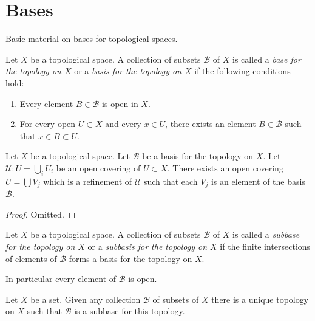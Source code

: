 \section{Bases}
\label{section-bases}

\noindent
Basic material on bases for topological spaces.

\begin{definition}
\label{definition-base}
Let $X$ be a topological space. A collection of subsets $\mathcal{B}$ of $X$
is called a {\it base for the topology on $X$} or a {\it basis for the
topology on $X$} if the following conditions hold:
\begin{enumerate}
\item Every element $B \in \mathcal{B}$ is open in $X$.
\item For every open $U \subset X$ and every $x \in U$,
there exists an element $B \in \mathcal{B}$ such that
$x \in B \subset U$.
\end{enumerate}
\end{definition}

\begin{lemma}
\label{lemma-refine-covering-basis}
Let $X$ be a topological space.
Let $\mathcal{B}$ be a basis for the topology on $X$.
Let $\mathcal{U} : U = \bigcup_i U_i$ be an open covering of
$U \subset X$. There exists an open covering $U = \bigcup V_j$
which is a refinement of $\mathcal{U}$ such that each
$V_j$ is an element of the basis $\mathcal{B}$.
\end{lemma}

\begin{proof}
Omitted.
\end{proof}

\begin{definition}
\label{definition-subbase}
Let $X$ be a topological space. A collection of subsets $\mathcal{B}$ of $X$
is called a {\it subbase for the topology on $X$} or a {\it subbasis for the
topology on $X$} if the finite intersections of
elements of $\mathcal{B}$ forms a basis for the topology on $X$.
\end{definition}

\noindent
In particular every element of $\mathcal{B}$ is open.

\begin{lemma}
\label{lemma-subbase}
Let $X$ be a set. Given any collection $\mathcal{B}$ of subsets of $X$
there is a unique topology on $X$ such that $\mathcal{B}$ is a subbase
for this topology.
\end{lemma}

